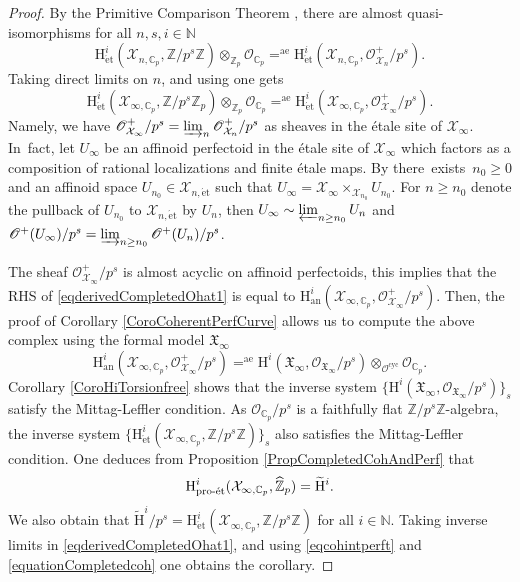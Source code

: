 \documentclass[JEP,XML,SOM,Unicode,published]{cedram}
\newcommand{\rae}{\mathrm{ae}}
\newcommand{\an}{\mathrm{an}}
\newcommand{\cyc}{\mathrm{cyc}}
\newcommand{\et}{\mathrm{\acute{e}t}}
\newcommand{\proet}{\mathrm{pro}\textup{-}\et}
\numberwithin{equation}{section}
\theoremstyle{definition}
\newcommand{\bb}[1]{\mathbb{#1}}
\newcommand{\n}[1]{\mathcal{#1}}
\newcommand{\f}[1]{\mathfrak{#1}}
\newcommand{\s}[1]{\mathscr{#1}}
\begin{document}
\begin{proof}
By the Primitive Comparison Theorem \cite[Th.\,5.1]{MR3090230}, there are almost quasi-isomorphisms for all $n,s,i\in \bb{N}$
\[
\mathrm{H}^i_{\et}(\n{X}_{n,\bb{C}_p}, \bb{Z}/p^s \bb{Z})\otimes_{\bb{Z}_p} \n{O}_{\bb{C}_p} =^{\rae} \mathrm{H}^i_{\et}(\n{X}_{n,\bb{C}_p}, \s{O}^+_{\n{X}_n} /p^s).
\]
Taking direct limits on $n$, and using \cite[Cor.,7.18]{MR3090258} one gets
\begin{equation}
\label{eqderivedCompletedOhat1}
\mathrm{H}^i_{\et}(\n{X}_{\infty, \bb{C}_p}, \bb{Z}/p^s \bb{Z}_p) \otimes_{\bb{Z}_p} \n{O}_{\bb{C}_p} =^{\rae} \mathrm{H}^i_{\et}(\n{X}_{\infty, \bb{C}_p}, \s{O}_{\n{X}_{\infty}}^+/p^s).
\end{equation}
Namely, we have $\s{O}^+_{\n{X}_{\infty}}/p^s= \varinjlim_{n} \s{O}^+_{\n{X}_n}/p^s$ as sheaves in the étale site of $\n{X}_{\infty}$. In~fact, let $U_{\infty}$ be an affinoid perfectoid in the étale site of $\n{X}_{\infty}$ which factors as a composition of rational localizations and finite étale maps. By \cite[Lem.\,7.5]{MR3090258} there~exists~\hbox{$n_0\!\geq\!0$} and an affinoid space $U_{n_0}\!\in\!\n{X}_{n,\et}$ such that $U_{\infty}\!=\!\n{X}_{\infty}\times_{\n{X}_{n_0}} U_{n_0}$. For $n\!\geq\!n_0$ denote the pullback of $U_{n_0}$ to $\n{X}_{n,\et}$ by $U_n$, then $U_{\infty}\sim \varprojlim_{n\geq n_0} U_{n}$ and $\s{O}^+(U_{\infty})/p^s=\varinjlim_{n\geq n_0} \s{O}^+(U_n)/p^s$.

The sheaf $\s{O}^+_{\n{X}_{\infty}}/p^s$ is almost acyclic on affinoid perfectoids, this implies that the RHS of \eqref{eqderivedCompletedOhat1} is equal to $\mathrm{H}^i_{\an}(\n{X}_{\infty,\bb{C}_p}, \s{O}^+_{\n{X}_{\infty}}/p^s)$. Then, the proof of Corollary \ref{CoroCoherentPerfCurve} allows us to compute the above complex using the formal model $\f{X}_{\infty}$
\begin{equation}
\label{eqcohintperft}
\mathrm{H}^i_{\an}(\n{X}_{\infty, \bb{C}_p}, \s{O}^+_{\n{X}_{\infty}}/p^s) =^{\rae} \mathrm{H}^i(\f{X}_{\infty}, \s{O}_{\f{X}_{\infty}}/p^s) \otimes_{\n{O}^{\cyc}} \n{O}_{\bb{C}_p}.
\end{equation}
Corollary \ref{CoroHiTorsionfree} shows that the inverse system $\{\mathrm{H}^i(\f{X}_{\infty}, \s{O}_{\f{X}_{\infty}}/p^s)\}_{s}$ satisfy the Mittag-Leffler condition. As $\n{O}_{\bb{C}_p}/p^s$ is a faithfully flat $\bb{Z}/p^s\bb{Z}$-algebra, the inverse system $\{\mathrm{H}^i_{\et}(\n{X}_{\infty, \bb{C}_p}, \bb{Z}/p^s \bb{Z})\}_s$ also satisfies the Mittag-Leffler condition. One deduces from Proposition \ref{PropCompletedCohAndPerf} that
\begin{equation}
\label{equationCompletedcoh}
\mathrm{H}^i_{\proet}(\n{X}_{\infty, \bb{C}_p}, \widehat{\bb{Z}}_p)= \widetilde{\mathrm{H}}^i.
\end{equation}
We also obtain that $\widetilde{\mathrm{H}}^i/p^s= \mathrm{H}^i_{\et}(\n{X}_{\infty,\bb{C}_p}, \bb{Z}/p^s \bb{Z})$ for all $i\in \bb{N}$. Taking inverse limits in \eqref{eqderivedCompletedOhat1}, and using \eqref{eqcohintperft} and \eqref{equationCompletedcoh} one obtains the corollary.
\end{proof}
\end{document}
